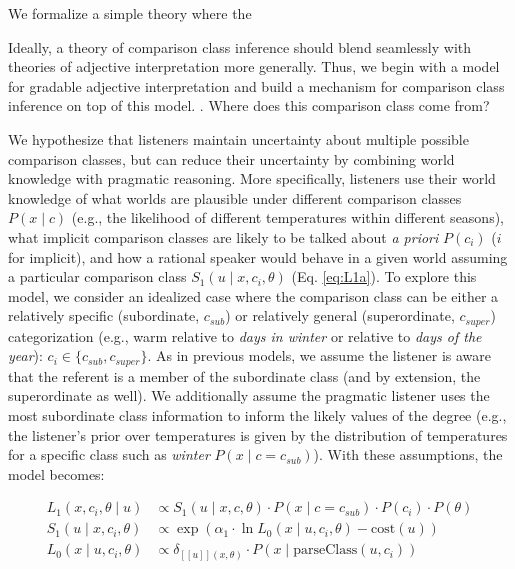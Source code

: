 \documentclass[doc]{apa6}
\begin{document}
We formalize a simple theory where the 

Ideally, a theory of comparison class inference should blend seamlessly with theories of adjective interpretation more generally. 
Thus, we begin with a model for gradable adjective interpretation and build a mechanism for comparison class inference on top of this model. 
. Where does this comparison class come from?

We hypothesize that listeners maintain uncertainty about multiple
possible comparison classes, but can reduce their uncertainty by
combining world knowledge with pragmatic reasoning. More specifically,
listeners use their world knowledge of what worlds are plausible under
different comparison classes \(P(x \mid c)\) (e.g., the likelihood of
different temperatures within different seasons), what implicit
comparison classes are likely to be talked about \emph{a priori}
\(P(c_i)\) (\(i\) for implicit), and how a rational speaker would behave
in a given world assuming a particular comparison class
\(S_{1}(u \mid x, c_i, \theta)\) (Eq. \ref{eq:L1a}). To explore this
model, we consider an idealized case where the comparison class can be
either a relatively specific (subordinate, \(c_{sub}\)) or relatively
general (superordinate, \(c_{super}\)) categorization (e.g., warm
relative to \emph{days in winter} or relative to \emph{days of the
year}): \(c_i \in \{c_{sub}, c_{super}\}\). As in previous models, we
assume the listener is aware that the referent is a member of the
subordinate class (and by extension, the superordinate as well). We
additionally assume the pragmatic listener uses the most subordinate
class information to inform the likely values of the degree (e.g., the
listener's prior over temperatures is given by the distribution of
temperatures for a specific class such as \emph{winter}
\(P(x \mid c = c_{sub})\)). With these assumptions, the model becomes:

\begin{align}
L_{1}(x, c_{i}, \theta \mid u) &\propto S_{1}(u \mid x, c, \theta) \cdot P(x \mid c =  c_{sub}) \cdot P(c_{i}) \cdot P(\theta) \label{eq:L1a}\\
S_{1}(u \mid x, c_i, \theta) &\propto \exp{(\alpha_1 \cdot \ln {L_{0}(x \mid u, c_i, \theta)}- \text{cost}(u)) } \label{eq:S1a}\\
L_{0}(x \mid u, c_i, \theta) &\propto {\delta_{[\![u]\!](x, \theta)} \cdot P(x \mid \text{parseClass}(u, c_i))} \label{eq:L0a}
\end{align}
\end{document}
